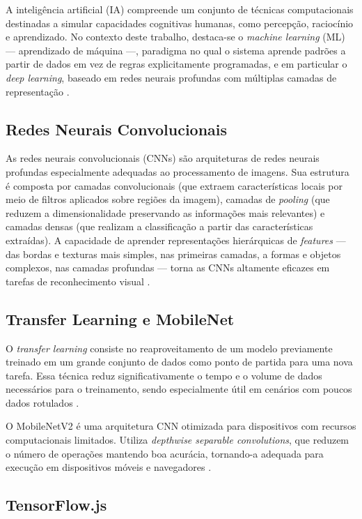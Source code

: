 \documentclass[
	12pt,
	openright,
	oneside,
	a4paper,
	chapter=TITLE,
	section=TITLE,
	subsection=TITLE,
	subsubsection=TITLE,
	english,
	brazil
	]{abntex2}
\begin{document}
A inteligência artificial (IA) compreende um conjunto de técnicas computacionais destinadas a simular capacidades cognitivas humanas, como percepção, raciocínio e aprendizado. No contexto deste trabalho, destaca-se o \textit{machine learning} (ML) — aprendizado de máquina —, paradigma no qual o sistema aprende padrões a partir de dados em vez de regras explicitamente programadas, e em particular o \textit{deep learning}, baseado em redes neurais profundas com múltiplas camadas de representação \cite{LECUN2015}.

\subsection{Redes Neurais Convolucionais}

As redes neurais convolucionais (CNNs) são arquiteturas de redes neurais profundas especialmente adequadas ao processamento de imagens. Sua estrutura é composta por camadas convolucionais (que extraem características locais por meio de filtros aplicados sobre regiões da imagem), camadas de \textit{pooling} (que reduzem a dimensionalidade preservando as informações mais relevantes) e camadas densas (que realizam a classificação a partir das características extraídas). A capacidade de aprender representações hierárquicas de \textit{features} — das bordas e texturas mais simples, nas primeiras camadas, a formas e objetos complexos, nas camadas profundas — torna as CNNs altamente eficazes em tarefas de reconhecimento visual \cite{GOODFELLOW2016}.

\subsection{Transfer Learning e MobileNet}

O \textit{transfer learning} consiste no reaproveitamento de um modelo previamente treinado em um grande conjunto de dados como ponto de partida para uma nova tarefa. Essa técnica reduz significativamente o tempo e o volume de dados necessários para o treinamento, sendo especialmente útil em cenários com poucos dados rotulados \cite{PAN2010}.

O MobileNetV2 é uma arquitetura CNN otimizada para dispositivos com recursos computacionais limitados. Utiliza \textit{depthwise separable convolutions}, que reduzem o número de operações mantendo boa acurácia, tornando-a adequada para execução em dispositivos móveis e navegadores \cite{SANDLER2018}.

\subsection{TensorFlow.js}
\end{document}
